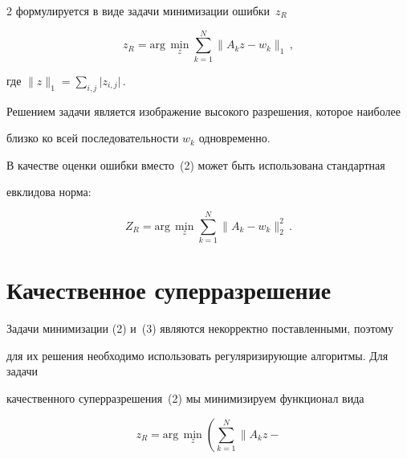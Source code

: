 \begin{multicols}{2}
формулируется в виде задачи минимизации ошибки~$z_R$


     \begin{equation}


z_R = \mathrm{arg}\,\underset{z}{\min} \sum\limits_{k=1}^N \parallel A_kz-


w_k\parallel_1\,,


     \label{e2nas}


     \end{equation}


где $\parallel z\parallel_1=\sum\limits_{i,j} \vert z_{i,j}\vert$\,.





     Решением задачи является изображение высокого разрешения, которое наиболее


близко ко всей последовательности $w_k$ одновременно.





     В качестве оценки ошибки вместо~(2) может быть использована стандартная


евклидова норма:


     \begin{equation}


     Z_R =\mathrm{arg}\,\underset{z}{\min}\sum\limits_{k=1}^N\parallel A_k-


w_k\parallel_2^2\,.


     \label{e3nas}


     \end{equation}





     \section{Качественное суперразрешение}





     Задачи минимизации (2) и~(3) являются некорректно поставленными, поэтому


для их решения необходимо использовать регуляризирующие алгоритмы. Для задачи


качественного суперразрешения~(2) мы минимизируем функционал вида


     \begin{equation}


z_R = \mathrm{arg}\,\underset{z}{\min}\left (\sum\limits_{k=1}^N\parallel A_kz-



\end{equation}
\end{multicols}
